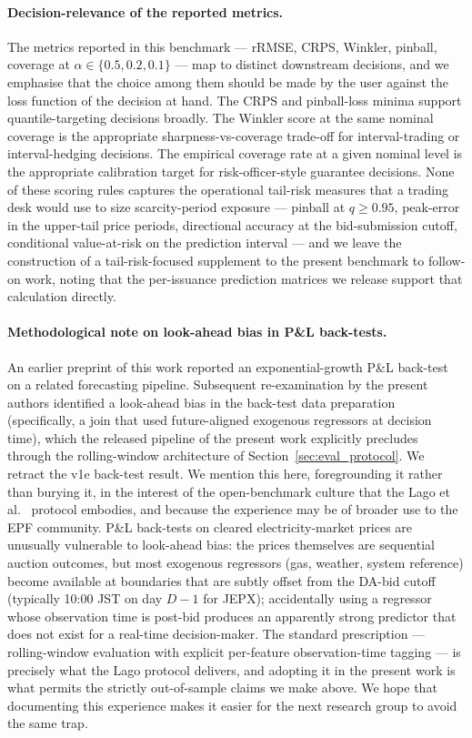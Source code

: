 \documentclass[review,3p,times,authoryear]{elsarticle}
\begin{document}
\paragraph{Decision-relevance of the reported metrics.}
The metrics reported in this benchmark --- rRMSE, CRPS, Winkler, pinball, coverage at \(\alpha\in\{0.5, 0.2, 0.1\}\) --- map to distinct downstream decisions, and we emphasise that the choice among them should be made by the user against the loss function of the decision at hand. The CRPS and pinball-loss minima support quantile-targeting decisions broadly. The Winkler score at the same nominal coverage is the appropriate sharpness-vs-coverage trade-off for interval-trading or interval-hedging decisions. The empirical coverage rate at a given nominal level is the appropriate calibration target for risk-officer-style guarantee decisions. None of these scoring rules captures the operational tail-risk measures that a trading desk would use to size scarcity-period exposure --- pinball at \(q\geq 0.95\), peak-error in the upper-tail price periods, directional accuracy at the bid-submission cutoff, conditional value-at-risk on the prediction interval --- and we leave the construction of a tail-risk-focused supplement to the present benchmark to follow-on work, noting that the per-issuance prediction matrices we release support that calculation directly.

\paragraph{Methodological note on look-ahead bias in P\&L back-tests.}
An earlier preprint of this work \citep{sriboriboon_v1e} reported an exponential-growth P\&L back-test on a related forecasting pipeline. Subsequent re-examination by the present authors identified a look-ahead bias in the back-test data preparation (specifically, a join that used future-aligned exogenous regressors at decision time), which the released pipeline of the present work explicitly precludes through the rolling-window architecture of Section~\ref{sec:eval_protocol}. We retract the v1e back-test result. We mention this here, foregrounding it rather than burying it, in the interest of the open-benchmark culture that the Lago et al.\ \citep{lago2021} protocol embodies, and because the experience may be of broader use to the EPF community. P\&L back-tests on cleared electricity-market prices are unusually vulnerable to look-ahead bias: the prices themselves are sequential auction outcomes, but most exogenous regressors (gas, weather, system reference) become available at boundaries that are subtly offset from the DA-bid cutoff (typically 10:00 JST on day \(D-1\) for JEPX); accidentally using a regressor whose observation time is post-bid produces an apparently strong predictor that does not exist for a real-time decision-maker. The standard prescription --- rolling-window evaluation with explicit per-feature observation-time tagging --- is precisely what the Lago protocol delivers, and adopting it in the present work is what permits the strictly out-of-sample claims we make above. We hope that documenting this experience makes it easier for the next research group to avoid the same trap.
\end{document}
